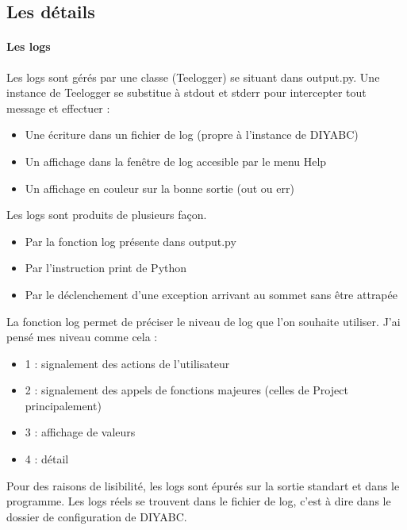 \documentclass[12pt,a4paper]{article}
\begin{document}
    \subsection{Les détails}
        \paragraph{Les logs}
        Les logs sont gérés par une classe (Teelogger) se situant dans output.py. Une instance de Teelogger
        se substitue à stdout et stderr pour intercepter tout message et effectuer : 
        \begin{itemize}
            \item Une écriture dans un fichier de log (propre à l'instance de DIYABC)
            \item Un affichage dans la fenêtre de log accesible par le menu Help
            \item Un affichage en couleur sur la bonne sortie (out ou err) \\
        \end{itemize}

        Les logs sont produits de plusieurs façon. 
        \begin{itemize}
            \item Par la fonction log présente dans output.py
            \item Par l'instruction print de Python
            \item Par le déclenchement d'une exception arrivant au sommet sans être attrapée\\
        \end{itemize}
        
        La fonction log permet de préciser le niveau de log que l'on souhaite utiliser. J'ai pensé mes niveau comme cela :
        \begin{itemize}
            \item 1 : signalement des actions de l'utilisateur
            \item 2 : signalement des appels de fonctions majeures (celles de Project principalement)
            \item 3 : affichage de valeurs
            \item 4 : détail
        \end{itemize}

        Pour des raisons de lisibilité, les logs sont épurés sur la sortie standart et dans le programme. Les logs réels
        se trouvent dans le fichier de log, c'est à dire dans le dossier de configuration de DIYABC.
\end{document}
